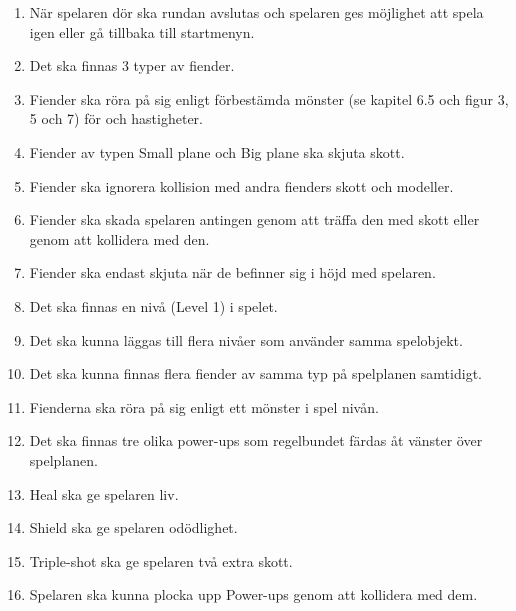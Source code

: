 \documentclass{TDP005mall}
\begin{document}
\begin{enumerate}
\item När spelaren dör ska rundan avslutas och spelaren ges möjlighet att spela igen eller gå tillbaka till startmenyn. 
\item Det ska finnas 3 typer av fiender.
\item Fiender ska röra på sig enligt förbestämda mönster (se kapitel 6.5 och figur 3, 5 och 7) för  och hastigheter.
\item Fiender av typen Small plane och Big plane ska skjuta skott.
\item Fiender ska ignorera kollision med andra fienders skott och modeller.
\item Fiender ska skada spelaren antingen genom att träffa den med skott eller genom att kollidera med den.
\item Fiender ska endast skjuta när de befinner sig i höjd med spelaren.
\item Det ska finnas en nivå (Level 1) i spelet.
\item Det ska kunna läggas till flera nivåer som använder samma spelobjekt.
\item Det ska kunna finnas flera fiender av samma typ på spelplanen samtidigt.
\item Fienderna ska röra på sig enligt ett mönster i spel nivån.
\item Det ska finnas tre olika power-ups som regelbundet färdas åt vänster över spelplanen.
\item Heal ska ge spelaren liv.
\item Shield ska ge spelaren odödlighet.
\item Triple-shot ska ge spelaren två extra skott. 
\item Spelaren ska kunna plocka upp Power-ups genom att kollidera med dem.
\end{enumerate}
\end{document}
